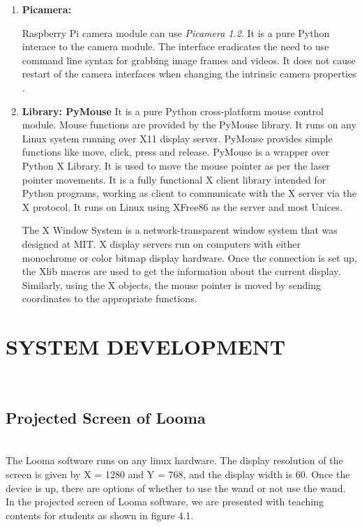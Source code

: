 \documentclass[12pt, a4paper]{article}
\begin{document}
\begin{enumerate}
\item \textbf{Picamera:}

Raspberry Pi camera module can use \emph{Picamera 1.2}. It is a pure Python interace to the camera module. The interface eradicates the need to use command line syntax for grabbing image frames and videos. It does not cause restart of the camera interfaces when changing the intrinsic camera properties
. 
\item \textbf{Library: PyMouse}
It is a pure Python cross-platform mouse control module. Mouse functions are provided by the PyMouse library. It runs on any Linux system running over X11 display server. PyMouse provides simple functions like move, click, press and release. PyMouse is a wrapper over Python X Library. It is used to move the mouse pointer as per the laser pointer movements. It is a fully functional X client library intended for Python programs, working as client to communicate with the X server via the X protocol. It runs on Linux using XFree86 as the server and most Unices.


The X Window System is a network-transparent window system that was designed at MIT. X display servers run on computers with either monochrome or color bitmap display hardware. Once the connection is set up, the Xlib macros are used to get the information about the current display. Similarly, using the X objects, the mouse pointer is moved by sending coordinates to the appropriate functions. 

\end{enumerate}
\newpage
\section{SYSTEM DEVELOPMENT}
~\\
\subsection{Projected Screen of Looma}
~\\
The Looma software runs on any linux hardware. The display resolution of the screen is given by X = 1280 and Y = 768, and the display width is 60. Once the device is up, there are options of whether to use the wand or not use the wand. In the projected screen of Looma software, we are presented with teaching contents for students as shown in figure 4.1.
\end{document}
